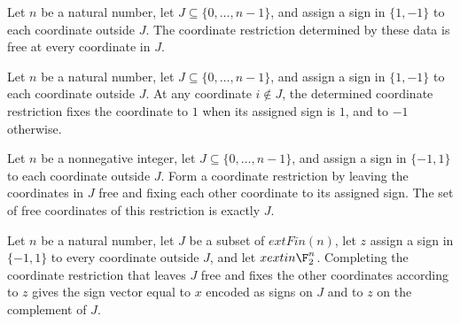 \begin{theorem}
\label{FABL.coordRestrictionOf_apply_of_mem}
\leanok
{}
Let $n$ be a natural number, let $J\subseteq\{0,\ldots,n-1\}$, and assign a sign in
$\{1,-1\}$ to each coordinate outside $J$. The coordinate restriction determined by
these data is free at every coordinate in $J$.
\end{theorem}

\begin{theorem}
\label{FABL.coordRestrictionOf_apply_of_not_mem}
\leanok
{}
Let $n$ be a natural number, let $J\subseteq\{0,\ldots,n-1\}$, and assign a sign in
$\{1,-1\}$ to each coordinate outside $J$. At any coordinate $i\notin J$, the
determined coordinate restriction fixes the coordinate to $1$ when its assigned sign is
$1$, and to $-1$ otherwise.
\end{theorem}

\begin{theorem}
\label{FABL.freeCoordinates_coordRestrictionOf}
\leanok
{}
Let $n$ be a nonnegative integer, let $J\subseteq\{0,\ldots,n-1\}$, and assign a sign in
$\{-1,1\}$ to each coordinate outside $J$. Form a coordinate restriction by leaving the
coordinates in $J$ free and fixing each other coordinate to its assigned sign. The set
of free coordinates of this restriction is exactly $J$.
\end{theorem}

\begin{theorem}
\label{FABL.complete_coordRestrictionOf}
\leanok
{}
Let $n$ be a natural number, let $J$ be a subset of $	ext{Fin}(n)$, let $z$ assign a
sign in $\{-1,1\}$ to every coordinate outside $J$, and let $x	ext{in }\F_2^n$.
Completing the coordinate restriction that leaves $J$ free and fixes the other
coordinates according to $z$ gives the sign vector equal to $x$ encoded as signs on $J$
and to $z$ on the complement of $J$.
\end{theorem}

